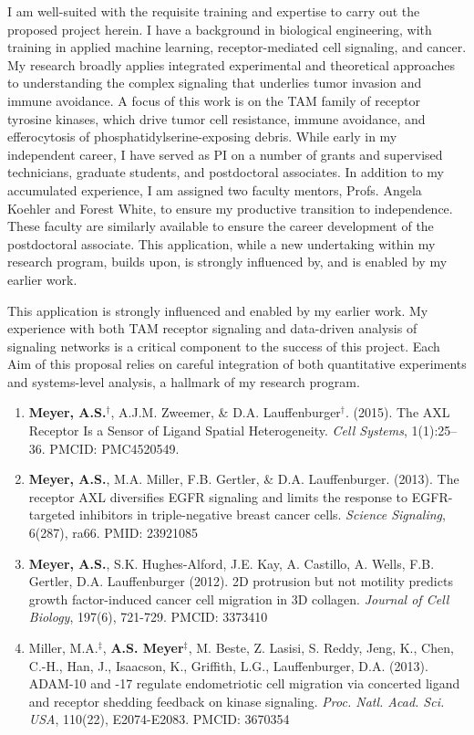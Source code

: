 \documentclass[11pt]{article}
\begin{document}
I am well-suited with the requisite training and expertise to carry out the proposed project herein. I have a background in biological engineering, with training in applied machine learning, receptor-mediated cell signaling, and cancer. My research broadly applies integrated experimental and theoretical approaches to understanding the complex signaling that underlies tumor invasion and immune avoidance. A focus of this work is on the TAM family of receptor tyrosine kinases, which drive tumor cell resistance, immune avoidance, and efferocytosis of phosphatidylserine-exposing debris. While early in my independent career, I have served as PI on a number of grants and supervised technicians, graduate students, and postdoctoral associates. In addition to my accumulated experience, I am assigned two faculty mentors, Profs. Angela Koehler and Forest White, to ensure my productive transition to independence. These faculty are similarly available to ensure the career development of the postdoctoral associate. This application, while a new undertaking within my research program, builds upon, is strongly influenced by, and is enabled by my earlier work. 

\hspace{0.5 in} This application is strongly influenced and enabled by my earlier work. My experience with both TAM receptor signaling and data-driven analysis of signaling networks is a critical component to the success of this project. Each Aim of this proposal relies on careful integration of both quantitative experiments and systems-level analysis, a hallmark of my research program.

\begin{enumerate}
  \item \textbf{Meyer, A.S.}$^\dag$, A.J.M. Zweemer, \& D.A. Lauffenburger$^\dag$. (2015). The AXL Receptor Is a Sensor of Ligand Spatial Heterogeneity. \emph{Cell Systems}, 1(1):25--36. PMCID: PMC4520549.
  \item \textbf{Meyer, A.S.}, M.A. Miller, F.B. Gertler, \& D.A. Lauffenburger. (2013). The receptor AXL diversifies EGFR signaling and limits the response to EGFR-targeted inhibitors in triple-negative breast cancer cells. \emph{Science Signaling}, 6(287), ra66. PMID: 23921085
  \item \textbf{Meyer, A.S.}, S.K. Hughes-Alford, J.E. Kay, A. Castillo, A. Wells, F.B. Gertler, D.A. Lauffenburger (2012). 2D protrusion but not motility predicts growth factor-induced cancer cell migration in 3D collagen. \emph{Journal of Cell Biology}, 197(6), 721-729. PMCID: 3373410
  \item Miller, M.A.$^\ddag$, \textbf{A.S. Meyer}$^\ddag$, M. Beste, Z. Lasisi, S. Reddy, Jeng, K., Chen, C.-H., Han, J., Isaacson, K., Griffith, L.G., Lauffenburger, D.A. (2013). ADAM-10 and -17 regulate endometriotic cell migration via concerted ligand and receptor shedding feedback on kinase signaling. \emph{Proc. Natl. Acad. Sci. USA}, 110(22), E2074-E2083. PMCID: 3670354
\end{enumerate}
\end{document}
